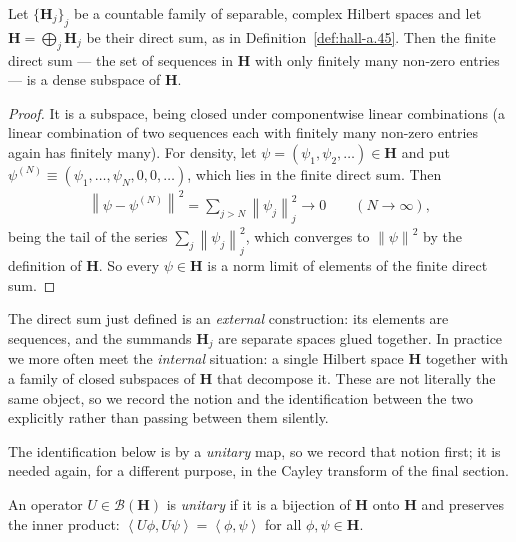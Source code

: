\begin{lemma}
    \label{lmm:finite-direct-sum-dense}
    \leanok
    Let $\{\mathbf{H}_j\}_{j}$ be a countable family of separable, complex Hilbert spaces and let $\mathbf{H} = \bigoplus_j \mathbf{H}_j$ be their direct sum, as in Definition~\ref{def:hall-a.45}. Then the finite direct sum — the set of sequences in $\mathbf{H}$ with only finitely many non-zero entries — is a dense subspace of $\mathbf{H}$.
\end{lemma}
\begin{proof}
    \leanok
It is a subspace, being closed under componentwise linear combinations (a linear combination of two sequences each with finitely many non-zero entries again has finitely many). For density, let $\psi = (\psi_1,\psi_2,\ldots) \in \mathbf{H}$ and put $\psi^{(N)} \equiv (\psi_1,\ldots,\psi_N,0,0,\ldots)$, which lies in the finite direct sum. Then
\begin{align}
    \left\| \psi - \psi^{(N)} \right\|^2 = \sum_{j > N} \left\| \psi_j \right\|_j^2 \longrightarrow 0 \qquad (N \to \infty),
\end{align}
being the tail of the series $\sum_j \left\| \psi_j \right\|_j^2$, which converges to $\left\| \psi \right\|^2$ by the definition of $\mathbf{H}$. So every $\psi \in \mathbf{H}$ is a norm limit of elements of the finite direct sum.
\end{proof}

The direct sum just defined is an \textit{external} construction: its elements are sequences, and the summands $\mathbf{H}_j$ are separate spaces glued together. In practice we more often meet the \textit{internal} situation: a single Hilbert space $\mathbf{H}$ together with a family of closed subspaces of $\mathbf{H}$ that decompose it. These are not literally the same object, so we record the notion and the identification between the two explicitly rather than passing between them silently.

The identification below is by a \textit{unitary} map, so we record that notion first; it is needed again, for a different purpose, in the Cayley transform of the final section.

\begin{definition}
    \label{def:unitary-operator}
    \leanok
    An operator $U \in \mathcal{B}(\mathbf{H})$ is \textit{unitary} if it is a bijection of $\mathbf{H}$ onto $\mathbf{H}$ and preserves the inner product: $\left< U\phi, U\psi \right> = \left< \phi,\psi \right>$ for all $\phi,\psi \in \mathbf{H}$.
\end{definition}

